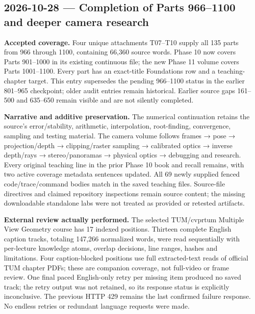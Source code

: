 \subsection{2026-10-28 --- Completion of Parts 966--1100 and deeper camera research}\label{appendix-a103e7846d21-completion-of-parts-9661100-and-deeper-camera-research}

\hypertarget{appendix-a103e7846d21-completion-of-parts-9661100-and-deeper-camera-research}{}

\textbf{Accepted coverage.} Four unique attachments T07--T10 supply all 135 parts from 966 through 1100, containing 66,360 source words. Phase 10 now covers Parts 901--1000 in its existing continuous file; the new Phase 11 volume covers Parts 1001--1100. Every part has an exact-title Foundations row and a teaching-chapter target. This entry supersedes the pending 966--1100 status in the earlier 801--965 checkpoint; older audit entries remain historical. Earlier source gaps 161--500 and 635--650 remain visible and are not silently completed.

\textbf{Narrative and additive preservation.} The numerical continuation retains the source's error/stability, arithmetic, interpolation, root-finding, convergence, sampling and testing material. The camera volume follows frames → pose → projection/depth → clipping/raster sampling → calibrated optics → inverse depth/rays → stereo/panoramas → physical optics → debugging and research. Every original teaching line in the prior Phase 10 book and recall remains, with two active coverage metadata sentences updated. All 69 newly supplied fenced code/trace/command bodies match in the saved teaching files. Source-file directives and claimed repository inspections remain source content; the missing downloadable standalone labs were not treated as provided or retested artifacts.

\textbf{External review actually performed.} The selected TUM/cvprtum Multiple View Geometry course has 17 indexed positions. Thirteen complete English caption tracks, totaling 147,266 normalized words, were read sequentially with per-lecture knowledge atoms, overlap decisions, line ranges, hashes and limitations. Four caption-blocked positions use full extracted-text reads of official TUM chapter PDFs; these are companion coverage, not full-video or frame review. One final paced English-only retry per missing item produced no saved track; the retry output was not retained, so its response status is explicitly inconclusive. The previous HTTP 429 remains the last confirmed failure response. No endless retries or redundant language requests were made.

